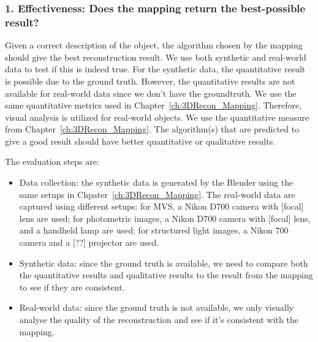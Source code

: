 \subsubsection{1. Effectiveness: Does the mapping return the best-possible result?}
Given a correct description of the object, the algorithm chosen by the mapping should give the best reconstruction result. We use both synthetic and real-world data to test if this is indeed true. For the synthetic data, the quantitative result is possible due to the ground truth. However, the quantitative results are not available for real-world data since we don't have the groundtruth. We use the same quantitative metrics used in Chapter~\ref{ch:3DRecon_Mapping}. Therefore, visual analysis is utilized for real-world objects. We use the quantitative measure from Chapter~\ref{ch:3DRecon_Mapping}. The algorithm(s) that are predicted to give a good result should have better quantitative or qualitative results.

The evaluation steps are:
\begin{itemize}
\item Data collection: the synthetic data is generated by the Blender using the same setups in Chpater~\ref{ch:3DRecon_Mapping}. The real-world data are captured using different setups: for MVS, a Nikon D700 camera with [focal] lens are used; for photometric images, a Nikon D700 camera with [focal] lens, and a handheld lamp are used; for structured light images, a Nikon 700 camera and a [??] projector are used.
\item Synthetic data: since the ground truth is available, we need to compare both the quantitative results and qualitative results to the result from the mapping to see if they are consistent.
\item Real-world data: since the ground truth is not available, we only visually analyse the quality of the reconstruction and see if it's consistent with the mapping.
\end{itemize}


